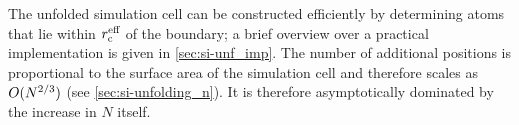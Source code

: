 The unfolded simulation cell can be constructed efficiently by determining atoms that lie within $r_{\text{c}}^{\text{eff}}$ of the boundary; a brief overview over a practical implementation is given in \cref{sec:si-unf_imp}. The number of additional positions is proportional to the surface area of the simulation cell and therefore scales as $O(N^{2/3})$ (see \cref{sec:si-unfolding_n}). It is therefore asymptotically dominated by the increase in $N$ itself.









